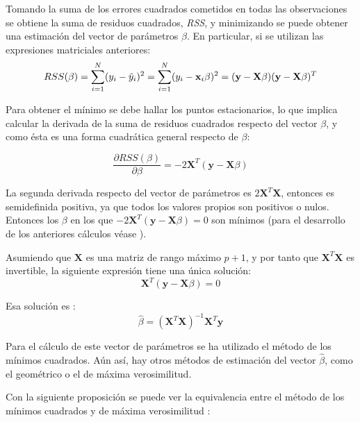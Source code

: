 \noindent Tomando la suma de los errores cuadrados cometidos  en todas las observaciones se obtiene la suma de residuos cuadrados, \emph{RSS}, y minimizando se puede obtener una estimación del vector de parámetros $\beta$. En particular, si se utilizan las expresiones matriciales  anteriores:
\begin{equation}
RSS(\beta)=\sum_{i=1}^N(y_i-\hat{y}_i)^2 = \sum_{i=1}^N(y_i-\textbf{x}_i\beta)^2=(\textbf{y}-\textbf{X}\beta)(\textbf{y}-\textbf{X}\beta)^T\\
\end{equation}

\noindent Para obtener el mínimo se debe hallar los puntos estacionarios, lo que implica calcular la derivada de la suma de residuos cuadrados respecto del vector $\beta$, y como ésta es una forma cuadrática general respecto de $\beta$:

\begin{equation}
\dfrac{\partial RSS(\beta)}{\partial \beta}= -2\mathbf{X}^T(\mathbf{y}-\mathbf{X}\beta)
\end{equation}

\noindent La segunda derivada respecto del vector de parámetros es $2\mathbf{X}^T\mathbf{X}$, entonces es  semidefinida positiva, ya que todos los valores propios son positivos o nulos. Entonces los $\beta$ en los que $-2\mathbf{X}^T(\mathbf{y}-\mathbf{X}\beta)=0$ son mínimos (para el desarrollo de los anteriores cálculos véase \cite{Morrison 1976}).  

\noindent Asumiendo que $\textbf{X}$ es una matriz de rango máximo $p+1$, y por tanto que $\mathbf{X}^T \mathbf{X}$ es invertible, la siguiente expresión tiene una única solución: 
\begin{equation}
\textbf{X}^T(\textbf{y}-\textbf{X}\beta)=0
\end{equation}

\noindent Esa solución es :
\begin{equation}
\hat{\beta}=(\textbf{X}^T\textbf{X})^{-1}\textbf{X}^T\textbf{y}
\end{equation}

\noindent Para el cálculo de este vector de parámetros se ha utilizado el método de los mínimos cuadrados. Aún así, hay otros métodos de estimación del vector $\hat{\beta}$, como el geométrico o el de máxima verosimilitud. 

\noindent Con la siguiente proposición se puede ver la equivalencia entre el método de los mínimos cuadrados y  de máxima verosimilitud \cite{Hastie 2001}:

